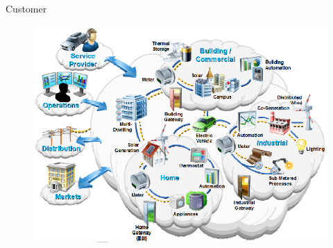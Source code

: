 

\begin{frame}[fragile]{Customer} 
	\begin{figure}[h] 
		\includegraphics[scale=0.45]{imgs/cust.png}
	\end{figure}
\end{frame}

